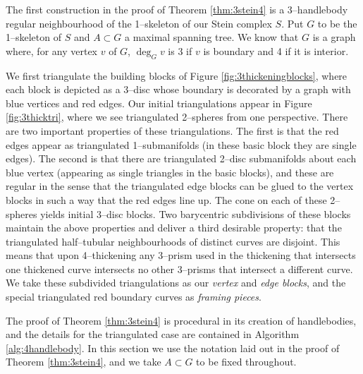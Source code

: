 The first construction in the proof of Theorem \ref{thm:3stein4} is a 3--handlebody regular neighbourhood of the 1--skeleton of our Stein complex $S$.
Put $G$ to be the 1--skeleton of $S$ and $A\subset G$ a maximal spanning tree.
We know that $G$ is a graph where, for any vertex $v$ of $G$, $\deg_G v$ is 3 if $v$ is boundary and 4 if it is interior.

We first triangulate the building blocks of Figure \ref{fig:3thickeningblocks}, where each block is depicted as a 3--disc whose boundary is decorated by a graph with blue vertices and red edges.
Our initial triangulations appear in Figure \ref{fig:3thicktri}, where we see triangulated 2--spheres from one perspective.
There are two important properties of these triangulations.
The first is that the red edges appear as triangulated 1--submanifolds (in these basic block they are single edges).
The second is that there are triangulated 2--disc submanifolds about each blue vertex (appearing as single triangles in the basic blocks), and these are regular in the sense that the triangulated edge blocks can be glued to the vertex blocks in such a way that the red edges line up.
The cone on each of these 2--spheres yields initial 3--disc blocks.
Two barycentric subdivisions of these blocks maintain the above properties and deliver a third desirable property: that the triangulated half--tubular neighbourhoods of distinct curves are disjoint.
This means that upon 4--thickening any 3--prism used in the thickening that intersects one thickened curve intersects no other 3--prisms that intersect a different curve.
We take these subdivided triangulations as our \emph{vertex} and \emph{edge blocks}, and the special triangulated red boundary curves as \emph{framing pieces}.

The proof of Theorem \ref{thm:3stein4} is procedural in its creation of handlebodies, and the details for the triangulated case are contained in Algorithm \ref{alg:4handlebody}.
In this section we use the notation laid out in the proof of Theorem \ref{thm:3stein4}, and we take $A\subset G$ to be fixed throughout.

